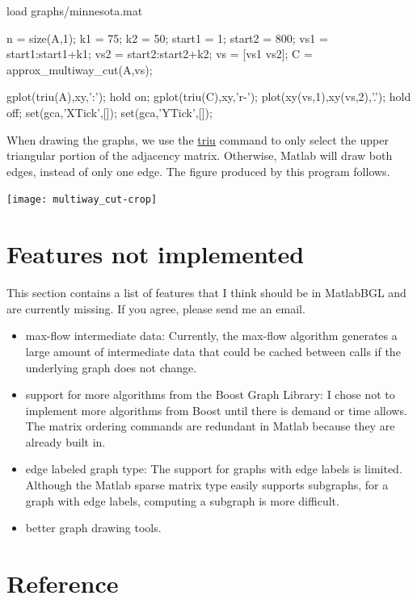 \documentclass[12pt]{article}
\newcommand{\mycmd}[1]{\url{#1}}
\begin{document}
\begin{mcode}
load graphs/minnesota.mat

n = size(A,1);
k1 = 75;
k2 = 50;
start1 = 1;
start2 = 800;
vs1 = start1:start1+k1;
vs2 = start2:start2+k2;
vs = [vs1 vs2];
C = approx_multiway_cut(A,vs);

gplot(triu(A),xy,':');
hold on;
gplot(triu(C),xy,'r-');
plot(xy(vs,1),xy(vs,2),'.');
hold off;
set(gca,'XTick',[]);
set(gca,'YTick',[]);
\end{mcode}

When drawing the graphs, we use the \mycmd{triu} command to only select the upper triangular portion of the adjacency matrix.  Otherwise, Matlab will draw both edges, instead of only one edge.  The figure produced by this program follows.

\begin{center}
\texttt{[image: multiway\_cut-crop]}
\end{center}

\section{Features not implemented}

This section contains a list of features that I think should be in MatlabBGL and are currently missing.  If you agree, please send me an email.

\begin{itemize}
\item max-flow intermediate data: Currently, the max-flow algorithm generates a large amount of intermediate data that could be cached between calls if the underlying graph does not change.  
\item support for more algorithms from the Boost Graph Library: I chose not to implement more algorithms from Boost until there is demand or time allows.  The matrix ordering commands are redundant in Matlab because they are already built in.
\item edge labeled graph type: The support for graphs with edge labels is limited.  Although the Matlab sparse matrix type easily supports subgraphs, for a graph with edge labels, computing a subgraph is more difficult.  
\item better graph drawing tools.
\end{itemize}



\section{Reference}
\end{document}
